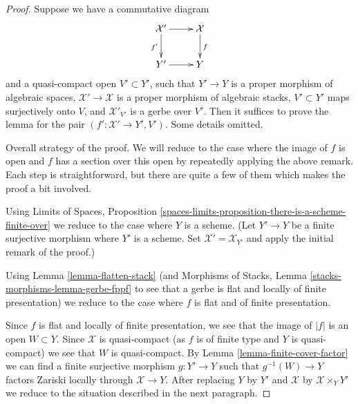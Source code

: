 \documentclass{stacks-project}
\theoremstyle{plain}
\theoremstyle{definition}
\theoremstyle{remark}
\numberwithin{equation}{subsection}
\begin{document}
\begin{proof}
Suppose we have a commutative diagram
$$
\xymatrix{
\mathcal{X}' \ar[d]_{f'} \ar[r] & \mathcal{X} \ar[d]^f \\
Y' \ar[r] & Y
}
$$
and a quasi-compact open $V' \subset Y'$, such that
$Y' \to Y$ is a proper morphism of algebraic spaces,
$\mathcal{X}' \to \mathcal{X}$ is a proper morphism of algebraic stacks,
$V' \subset Y'$ maps surjectively onto $V$, and
$\mathcal{X}'_{V'}$ is a gerbe over $V'$.
Then it suffices to prove the lemma for the pair
$(f' : \mathcal{X}' \to Y', V')$. Some details omitted.

\medskip\noindent
Overall strategy of the proof. We will reduce
to the case where the image of $f$ is open and $f$
has a section over this open by repeatedly applying the
above remark. Each step is straightforward, but there are
quite a few of them which makes the proof a bit involved.

\medskip\noindent
Using Limits of Spaces, Proposition
\ref{spaces-limits-proposition-there-is-a-scheme-finite-over}
we reduce to the case where $Y$ is a scheme.
(Let $Y' \to Y$ be a finite surjective morphism where $Y'$ is
a scheme. Set $\mathcal{X}' = \mathcal{X}_{Y'}$ and apply
the initial remark of the proof.)

\medskip\noindent
Using Lemma \ref{lemma-flatten-stack}
(and Morphisms of Stacks, Lemma \ref{stacks-morphisms-lemma-gerbe-fppf}
to see that a gerbe is flat and locally of finite presentation)
we reduce to the case where $f$ is flat and of finite presentation.

\medskip\noindent
Since $f$ is flat and locally of finite
presentation, we see that the image of $|f|$ is an open $W \subset Y$.
Since $\mathcal{X}$ is quasi-compact (as $f$ is of finite type
and $Y$ is quasi-compact) we see that $W$ is quasi-compact.
By Lemma \ref{lemma-finite-cover-factor}
we can find a finite surjective morphism $g : Y' \to Y$
such that $g^{-1}(W) \to Y$ factors Zariski locally
through $\mathcal{X} \to Y$.
After replacing $Y$ by $Y'$ and $\mathcal{X}$ by
$\mathcal{X} \times_Y Y'$ we reduce to the situation
described in the next paragraph.


\end{proof}
\end{document}

